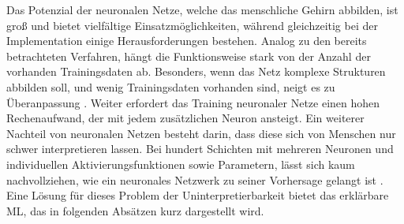 Das Potenzial der neuronalen Netze, welche das menschliche Gehirn abbilden, ist groß und bietet vielfältige Einsatzmöglichkeiten, während gleichzeitig bei der Implementation einige Herausforderungen bestehen. Analog zu den bereits betrachteten Verfahren, hängt die Funktionsweise stark von der Anzahl der vorhanden Trainingsdaten ab. Besonders, wenn das Netz komplexe Strukturen abbilden soll, und wenig Trainingsdaten vorhanden sind, neigt es zu Überanpassung . Weiter erfordert das Training neuronaler Netze einen hohen Rechenaufwand, der mit jedem zusätzlichen Neuron ansteigt. Ein weiterer Nachteil von neuronalen Netzen besteht darin, dass diese sich von Menschen nur schwer interpretieren lassen. Bei hundert Schichten mit mehreren Neuronen und individuellen Aktivierungsfunktionen sowie Parametern, lässt sich kaum nachvollziehen, wie ein neuronales Netzwerk zu seiner Vorhersage gelangt ist \cite{Ng.2018}. Eine Lösung für dieses Problem der Uninterpretierbarkeit bietet das erklärbare ML, das in folgenden Absätzen kurz dargestellt wird. 
